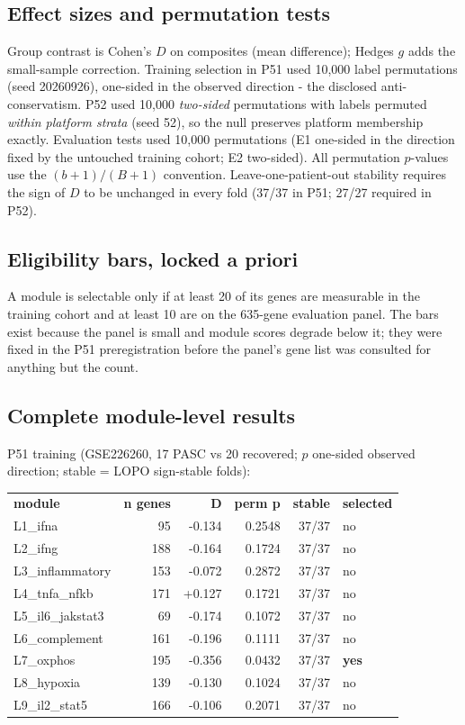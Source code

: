 \documentclass[11pt,a4paper]{article}
\begin{document}
\subsection{Effect sizes and permutation tests}
Group contrast is Cohen's $D$ on composites (mean difference); Hedges $g$ adds
the small-sample correction. Training selection in P51 used 10{,}000 label
permutations (seed 20260926), one-sided in the observed direction - the
disclosed anti-conservatism. P52 used 10{,}000 \emph{two-sided} permutations
with labels permuted \emph{within platform strata} (seed 52), so the null
preserves platform membership exactly. Evaluation tests used 10{,}000
permutations (E1 one-sided in the direction fixed by the untouched training
cohort; E2 two-sided). All permutation $p$-values use the $(b+1)/(B+1)$
convention. Leave-one-patient-out stability requires the sign of $D$ to be
unchanged in every fold (37/37 in P51; 27/27 required in P52).

\subsection{Eligibility bars, locked a priori}
A module is selectable only if at least 20 of its genes are measurable in the
training cohort and at least 10 are on the 635-gene evaluation panel. The bars
exist because the panel is small and module scores degrade below it; they were
fixed in the P51 preregistration before the panel's gene list was consulted
for anything but the count.

\subsection{Complete module-level results}
P51 training (GSE226260, 17 PASC vs 20 recovered; $p$ one-sided observed
direction; stable = LOPO sign-stable folds):

\begin{longtable}{lrrrrl}
\textbf{module} & \textbf{n genes} & \textbf{D} & \textbf{perm p} & \textbf{stable} & \textbf{selected}\\
L1_ifna & 95 & -0.134 & 0.2548 & 37/37 & no \\
L2_ifng & 188 & -0.164 & 0.1724 & 37/37 & no \\
L3_inflammatory & 153 & -0.072 & 0.2872 & 37/37 & no \\
L4_tnfa_nfkb & 171 & +0.127 & 0.1721 & 37/37 & no \\
L5_il6_jakstat3 & 69 & -0.174 & 0.1072 & 37/37 & no \\
L6_complement & 161 & -0.196 & 0.1111 & 37/37 & no \\
L7_oxphos & 195 & -0.356 & 0.0432 & 37/37 & \textbf{yes} \\
L8_hypoxia & 139 & -0.130 & 0.1024 & 37/37 & no \\
L9_il2_stat5 & 166 & -0.106 & 0.2071 & 37/37 & no \\
\end{longtable}
\end{document}
